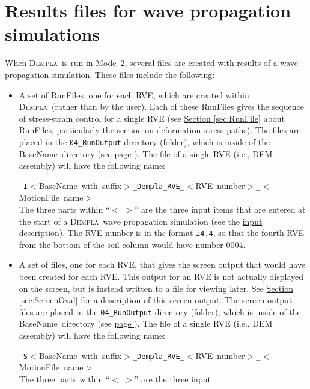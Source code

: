 \documentclass[letterpaper,11pt]{article}
\newcommand{\Dempla}{\textsc{Dempla}}
\newcommand{\RunFile}{\textsf{RunFile}}
\newcommand{\BaseName}{\textsf{BaseName}}
\newcommand{\MotionFile}{\textsf{MotionFile}}
\begin{document}
\section{Results files for wave propagation simulations}\label{sec:Results}
When \Dempla\ is run in Mode~2,
several files are created with results of a wave propagation
simulation.
These files include the following:
\begin{itemize}
  \item
  A set of \RunFile s,
  one for each RVE, which are created within \Dempla\ (rather
  than by the user).
  Each of these \RunFile s gives the sequence of stress-strain
  control for a single RVE
  (see \hyperref[sec:RunFile]{Section \ref*{sec:RunFile}} about
  \RunFile s,
  particularly the section on
  \hyperref[sec:runfile2]{deformation-stress paths}).
  The files are placed in the \texttt{04\_RunOutput}
  directory (folder), which is inside of the  \BaseName\ directory
  (see \hyperref[item:BaseNameDirectory]{page \pageref*{item:BaseNameDirectory}}).
  The file of a single RVE (i.e., DEM assembly)
  will have the following name:
  \par
  \mbox{%
  \texttt{I}$<$\BaseName\ with suffix$>$\texttt{\_Dempla\_RVE\_}$<$RVE number$>$\texttt{\_}$<$\MotionFile\ name$>$}\\[0.5ex]
  The three parts within ``$<\;>$'' are the three input
  items that are entered at the start of a \Dempla\ wave
  propagation simulation
  (see the \hyperref[par:input]{input description}).
  The RVE number is in the format \texttt{i4.4}, so that the
  fourth RVE from the bottom of the soil column would have
  number 0004.
%
  \item
  A set of files, one for each RVE,
  that gives the screen output that would
  have been created for each RVE.
  This output for an RVE is not actually displayed on the screen,
  but is instead written to a file for viewing later.
  See \hyperref[sec:ScreenOval]{Section \ref*{sec:ScreenOval}} for
  a description of this screen output.
  The screen output files are placed in the \texttt{04\_RunOutput}
  directory (folder), which is inside of the  \BaseName\ directory
  (see \hyperref[item:BaseNameDirectory]{page \pageref*{item:BaseNameDirectory}}).
  The file of a single RVE (i.e., DEM assembly)
  will have the following name:
  \par
  \mbox{%
  	\texttt{S}$<$\BaseName\ with suffix$>$\texttt{\_Dempla\_RVE\_}$<$RVE number$>$\texttt{\_}$<$\MotionFile\ name$>$}\\[0.5ex]
%
  The three parts within ``$<\;>$'' are the three input

\end{itemize}
\end{document}
